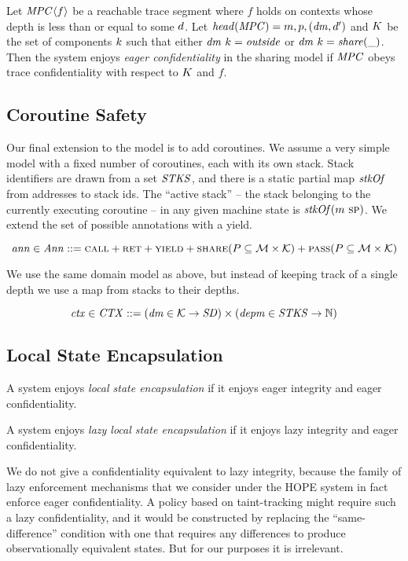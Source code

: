 \documentclass[acmsmall,review,anonymous]{acmart}\settopmatter{printfolios=true,printccs=false,printacmref=false}
\begin{document}
 Let \(\mathit{MPC} \langle f \rangle\) be a reachable trace segment where \(f\) holds
on contexts whose depth is less than or equal to some \(d\). Let \(\mathit{head}(\mathit{MPC}) =
m,p,(\mathit{dm},d')\) and \(K\) be the set of components
\(k\) such that either \(\mathit{dm} ~ k = \mathit{outside}\) or
\(\mathit{dm} ~ k = \mathit{share(\_)}\). Then the system enjoys {\em eager confidentiality}
in the sharing model if \(\mathit{MPC}\) obeys trace confidentiality with respect to \(K\)
and \(f\).

\subsection{Coroutine Safety}

Our final extension to the model is to add coroutines. We assume a very simple model with
a fixed number of coroutines, each with its own stack.
Stack identifiers are drawn from a set \(\mathit{STKS}\), and there is a static partial map
\(\mathit{stkOf}\) from addresses to stack ids. The ``active stack'' -- the stack belonging to the
currently executing coroutine -- in any given machine state is \(\mathit{stkOf}(m ~ \textsc{sp})\).
We extend the set of possible annotations with a yield.

\[\mathit{ann} \in \mathit{Ann} ::= \text{\sc call} + \text{\sc ret} + \text{\sc yield} +
\text{\sc share}(P \subseteq {\mathcal M} \times {\mathcal K}) +
\text{\sc pass}(P \subseteq {\mathcal M} \times {\mathcal K})\]

We use the same domain model as above, but instead of keeping track of a single depth
we use a map from stacks to their depths.

\[\mathit{ctx} \in \mathit{CTX} ::= (\mathit{dm} \in {\mathcal K} \rightarrow \mathit{SD}) \times
(\mathit{depm} \in \mathit{STKS} \rightarrow \mathbb{N})\]

\subsection{Local State Encapsulation}

 A system enjoys {\em local state encapsulation} if it enjoys eager integrity and
eager confidentiality.

 A system enjoys {\em lazy local state encapsulation} if it enjoys lazy integrity
and eager confidentiality.

We do not give a confidentiality equivalent to lazy integrity, because the family of lazy
enforcement mechanisms that we consider under the HOPE system in fact enforce eager confidentiality.
A policy based on taint-tracking might require such a lazy confidentiality, and it would be constructed
by replacing the ``same-difference'' condition with one that requires any differences to produce
observationally equivalent states. But for our purposes it is irrelevant.
\end{document}
